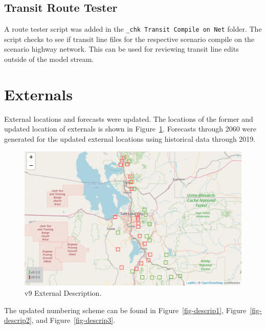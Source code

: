 \documentclass[
  letterpaper,
  DIV=11,
  numbers=noendperiod]{scrreprt}
\begin{document}
\hypertarget{transit-route-tester}{%
\subsection{Transit Route Tester}\label{transit-route-tester}}

A route tester script was added in the
\texttt{\_chk\ Transit\ Compile\ on\ Net} folder. The script checks to
see if transit line files for the respective scenario compile on the
scenario highway network. This can be used for reviewing transit line
edits outside of the model stream.

\hypertarget{externals}{%
\section{Externals}\label{externals}}

External locations and forecasts were updated. The locations of the
former and updated location of externals is shown in
Figure~\ref{fig-externals-pdf}. Forecasts through 2060 were generated
for the updated external locations using historical data through 2019.

\begin{figure}[H]

{\centering \includegraphics{v9x/v900/whats-new/_pictures/externals.png}

}

\caption{\label{fig-externals-pdf}v9 External Description.}

\end{figure}

The updated numbering scheme can be found in Figure~\ref{fig-descrip1},
Figure~\ref{fig-descrip2}, and Figure~\ref{fig-descrip3}.
\end{document}
